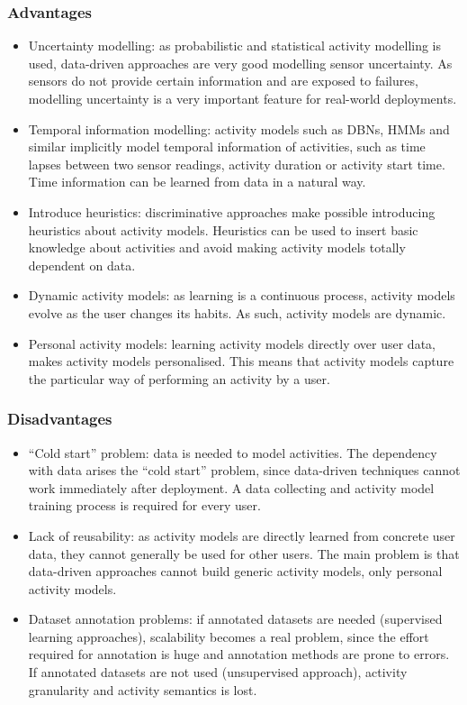 \subsubsection*{Advantages}
\begin{itemize}
 \item Uncertainty modelling: as probabilistic and statistical activity modelling is used, data-driven approaches are very good modelling sensor uncertainty. As sensors do not provide certain information and are exposed to failures, modelling uncertainty is a very important feature for real-world deployments.
 \item Temporal information modelling: activity models such as DBNs, HMMs and similar implicitly model temporal information of activities, such as time lapses between two sensor readings, activity duration or activity start time. Time information can be learned from data in a natural way.
 \item Introduce heuristics: discriminative approaches make possible introducing heuristics about activity models. Heuristics can be used to insert basic knowledge about activities and avoid making activity models totally dependent on data.
 \item Dynamic activity models: as learning is a continuous process, activity models evolve as the user changes its habits. As such, activity models are dynamic.
 \item Personal activity models: learning activity models directly over user data, makes activity models personalised. This means that activity models capture the particular way of performing an activity by a user.
\end{itemize}

\subsubsection*{Disadvantages}
\begin{itemize}
 \item ``Cold start'' problem: data is needed to model activities. The dependency with data arises the ``cold start'' problem, since data-driven techniques cannot work immediately after deployment. A data collecting and activity model training process is required for every user.
 \item Lack of reusability: as activity models are directly learned from concrete user data, they cannot generally be used for other users. The main problem is that data-driven approaches cannot build generic activity models, only personal activity models.
 \item Dataset annotation problems: if annotated datasets are needed (supervised learning approaches), scalability becomes a real problem, since the effort required for annotation is huge and annotation methods are prone to errors. If annotated datasets are not used (unsupervised approach), activity granularity and activity semantics is lost. 
\end{itemize}

